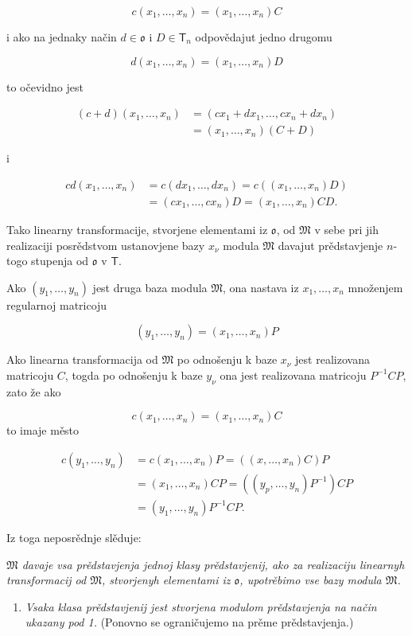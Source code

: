 \documentclass[11pt]{article}
\providecommand{\tightlist}{\setlength{\itemsep}{0pt}\setlength{\parskip}{0pt}}
\begin{document}
\[
c(x_1,\ldots,x_n)=(x_1,\ldots,x_n)C
\]

i ako na jednaky način \(d\in\mathfrak{o}\) i \(D\in\mathsf T_n\) odpovědajut jedno drugomu

\[
d(x_1,\ldots,x_n)=(x_1,\ldots,x_n)D
\]

to očevidno jest

\[
\begin{aligned}
(c+d)(x_1,\ldots,x_n)
&=(cx_1+dx_1,\ldots,cx_n+dx_n)\\
&=(x_1,\ldots,x_n)(C+D)
\end{aligned}
\]

i

\[
\begin{aligned}
cd(x_1,\ldots,x_n)
&=c(dx_1,\ldots,dx_n)=c((x_1,\ldots,x_n)D)\\
&=(cx_1,\ldots,cx_n)D=(x_1,\ldots,x_n)CD.
\end{aligned}
\]

Tako linearny transformacije, stvorjene elementami iz \(\mathfrak{o}\), od \(\mathfrak M\) v sebe pri jih realizaciji posrědstvom ustanovjene bazy \(x_\nu\) modula \(\mathfrak M\) davajut prědstavjenje \(n\)-togo stupenja od \(\mathfrak{o}\) v \(\mathsf T\).

Ako \((y_1,\ldots,y_n)\) jest druga baza modula \(\mathfrak M\), ona nastava iz \(x_1,\ldots,x_n\) množenjem regularnoj matricoju

\[(y_1,\ldots,y_n)=(x_1,\ldots,x_n)P\]

Ako linearna transformacija od \(\mathfrak M\) po odnošenju k baze \(x_\nu\) jest realizovana matricoju \(C\), togda po odnošenju k baze \(y_\nu\) ona jest realizovana matricoju \(P^{-1}CP\), zato že ako

\[c(x_1,\ldots,x_n)=(x_1,\ldots,x_n)C\]
to imaje město

\[
\begin{aligned}
c(y_1,\ldots,y_n)
&=c(x_1,\ldots,x_n)P=((x,\ldots,x_n)C)P\\
&=(x_1,\ldots,x_n)CP=((y_p,\ldots,y_n)P^{-1})CP\\
&=(y_1,\ldots,y_n)P^{-1}CP.
\end{aligned}
\]

Iz toga neposrědnje slěduje:

\emph{\(\mathfrak M\) davaje vsa prědstavjenja jednoj klasy prědstavjenij, ako za realizaciju linearnyh transformacij od \(\mathfrak M\), stvorjenyh elementami iz \(\mathfrak{o}\), upotrěbimo vse bazy modula \(\mathfrak M\).}

\begin{enumerate}
\def\labelenumi{\arabic{enumi}.}
\setcounter{enumi}{1}
\tightlist
\item
  \emph{Vsaka klasa prědstavjenij jest stvorjena modulom prědstavjenja na način ukazany pod 1.} (Ponovno se ograničujemo na prěme prědstavjenja.)
\end{enumerate}
\end{document}
